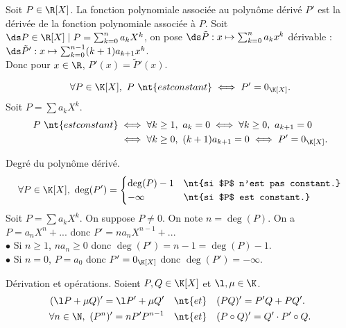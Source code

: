\documentclass[11pt]{article}
\begin{document}
\vspace*{-0.8cm}

\begin{prop}{}{}
    Soit $P\in\R[X]$. La fonction polynomiale associée au polynôme dérivé $P'$ est la dérivée de la fonction polynomiale associée à $P$.
    \tcblower
    Soit $\ds P\in\R[X]\mid P=\sum_{k=0}^na_kX^k$, on pose $\ds\tilde{P}:x\mapsto \sum_{k=0}^na_kx^k$ dérivable : $\ds\tilde{P}':x\mapsto\sum_{k=0}^{n-1}(k+1)a_{k+1}x^k$.\\
    Donc pour $x\in\R$, $P'(x)=\tilde{P}'(x)$.
\end{prop}

\vspace*{-0.8cm}

\begin{prop}{}{}
    \begin{equation*}
        \forall P \in \K[X], ~ P~\nt{est constant} \iff P' = 0_{\K[X]}.
    \end{equation*}
    \tcblower
    Soit $P=\sum a_kX^k$.
    \begin{align*}
        P~\nt{est constant} &\iff \forall k \geq 1, ~ a_k = 0 \iff \forall k \geq 0, ~ a_{k+1}=0\\
        &\iff \forall k \geq 0, ~ (k+1)a_{k+1}=0 \iff P'=0_{\K[X]}.
    \end{align*}
\end{prop}

\vspace*{-0.8cm}

\begin{prop}{Degré du polynôme dérivé.}{}
    \begin{equation*}
        \forall P \in \K[X], ~ \deg(P')=\begin{cases}\deg(P)-1 &\nt{si $P$ n'est pas constant.}\\ -\infty &\nt{si $P$ est constant.}\end{cases}
    \end{equation*}
    \tcblower
    Soit $P=\sum a_kX^k$. On suppose $P\neq0$. On note $n=\deg(P)$. On a $P=a_nX^n+...$ donc $P'=na_nX^{n-1}+...$\\
    $\bullet$ Si $n\geq1$, $na_n\geq0$ donc $\deg(P')=n-1=\deg(P)-1$.\\
    $\bullet$ Si $n=0$, $P=a_0$ donc $P'=0_{\K[X]}$ donc $\deg(P')=-\infty$.
\end{prop}

\begin{prop}{Dérivation et opérations.}{}
    Soient $P,Q\in\K[X]$ et $\l,\mu\in\K$.
    \begin{align*}
        (\l P + \mu Q)' = \l P' + \mu Q' \quad &\nt{et} \quad (PQ)' = P'Q + PQ'.\\
        \forall n \in \N, ~ (P^n)'=nP'P^{n-1} \quad &\nt{et} \quad (P\circ Q)'=Q'\cdot P'\circ Q.
    \end{align*}
\end{prop}
\end{document}
